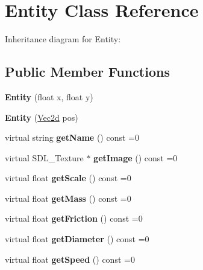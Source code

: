 \hypertarget{classEntity}{}\section{Entity Class Reference}
\label{classEntity}


Inheritance diagram for Entity\+:
\subsection*{Public Member Functions}
\begin{DoxyCompactItemize}
\item 
\mbox{\label{classEntity_ae5a9ed9b94b78f5f89b177a611689e5f}} 
{\bfseries Entity} (float x, float y)
\item 
\mbox{\label{classEntity_a8a5753cf9a8876ae32ac7a7013b89d82}} 
{\bfseries Entity} (\hyperlink{classVec2d}{Vec2d} pos)
\item 
\mbox{\label{classEntity_a41871d74936c26980b4a6cb39ede7c98}} 
virtual string {\bfseries get\+Name} () const =0
\item 
\mbox{\label{classEntity_ac9fff4b7f97744a9c51c86bc47d0820a}} 
virtual S\+D\+L\+\_\+\+Texture $\ast$ {\bfseries get\+Image} () const =0
\item 
\mbox{\label{classEntity_a48d2be33b6aadbd233219df75c69c55f}} 
virtual float {\bfseries get\+Scale} () const =0
\item 
\mbox{\label{classEntity_adbd2f042eb9d6a26d30a31f152b31612}} 
virtual float {\bfseries get\+Mass} () const =0
\item 
\mbox{\label{classEntity_a02c53507c082f663b40ac606e1d36c2d}} 
virtual float {\bfseries get\+Friction} () const =0
\item 
\mbox{\label{classEntity_a48f4177bdcc57c7bd7c1c353ef614d25}} 
virtual float {\bfseries get\+Diameter} () const =0
\item 
\mbox{\label{classEntity_ad1cf0b07be743a71a5d10a4b17f8ea36}} 
virtual float {\bfseries get\+Speed} () const =0
\item 

\end{DoxyCompactItemize}
